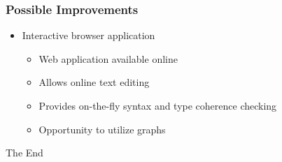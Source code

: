 \documentclass{beamer}
\begin{document}
\begin{frame}
    \frametitle{Possible Improvements}
    \begin{itemize}
        \item Interactive browser application
            \begin{itemize}
                \item Web application available online
                \item Allows online text editing
                \item Provides on-the-fly syntax and type coherence checking
                \item Opportunity to utilize graphs
            \end{itemize}
    \end{itemize}
\end{frame}

\begin{frame}
    \begin{center}
        \Huge The End
    \end{center}
\end{frame}
\end{document}
